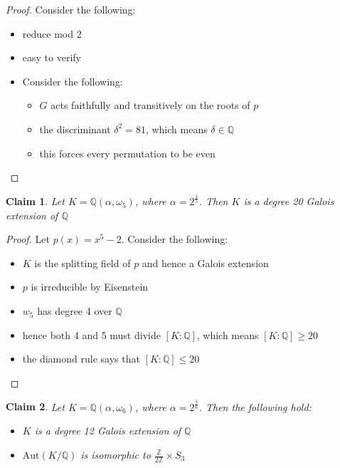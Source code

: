 \documentclass{article}
\newtheorem{claim}{Claim}
\begin{document}
\begin{proof}
  Consider the following:
  \begin{itemize}
    \item reduce mod 2
    \item easy to verify
    \item Consider the following:
          \begin{itemize}
            \item $G$ acts faithfully and transitively on the roots of $p$
            \item the discriminant $\delta^2 = 81$, which means $\delta \in \mathbb{Q}$
            \item this forces every permutation to be even
          \end{itemize}
  \end{itemize}
\end{proof}

\begin{claim}
  Let $K=\mathbb{Q}(\alpha,\omega_5)$, where $\alpha=2^\frac{1}{5}$. Then $K$ is a degree 20 Galois extension of $\mathbb{Q}$
\end{claim}

\begin{proof}
  Let $p(x)=x^5-2$. Consider the following:
  \begin{itemize}
    \item $K$ is the splitting field of $p$ and hence a Galois extension
    \item $p$ is irreducible by Eisenstein 
    \item $w_5$ has degree 4 over $\mathbb{Q}$
    \item hence both 4 and 5 must divide $[K:\mathbb{Q}]$, which means $[K:\mathbb{Q}] \geq 20$
    \item the diamond rule says that $[K:\mathbb{Q}] \leq 20$
  \end{itemize}
\end{proof}

\begin{claim}
  Let $K=\mathbb{Q}(\alpha,\omega_6)$, where $\alpha=2^\frac{1}{6}$. Then the following hold:
  \begin{itemize}
    \item $K$ is a degree 12 Galois extension of $\mathbb{Q}$
    \item $\text{Aut}(K/\mathbb{Q})$ is isomorphic to $\frac{\mathbb{Z}}{2\mathbb{Z}} \times S_3$
  \end{itemize}
\end{claim}
\end{document}
